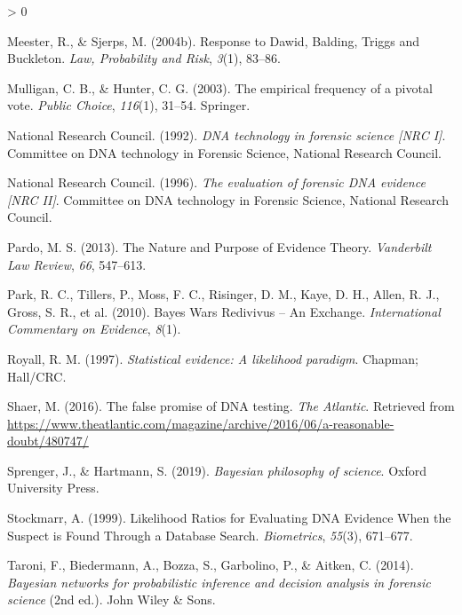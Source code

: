\documentclass[
  10pt,
  dvipsnames,enabledeprecatedfontcommands]{scrartcl}
\newlength{\cslhangindent}
\newenvironment{CSLReferences}[2] %
 {%
  \setlength{\parindent}{0pt}
  \ifodd #1 \everypar{\setlength{\hangindent}{\cslhangindent}}\ignorespaces\fi
  \ifnum #2 > 0
  \setlength{\parskip}{#2\baselineskip}
  \fi
 }%
 {}
\begin{document}
\begin{CSLReferences}{1}{0}
\leavevmode\hypertarget{ref-meester2004ResponseDawidBalding}{}%
Meester, R., \& Sjerps, M. (2004b). Response to {Dawid}, {Balding},
{Triggs} and {Buckleton}. \emph{Law, Probability and Risk}, \emph{3}(1),
83--86.

\leavevmode\hypertarget{ref-mulligan2003empirical}{}%
Mulligan, C. B., \& Hunter, C. G. (2003). The empirical frequency of a
pivotal vote. \emph{Public Choice}, \emph{116}(1), 31--54. Springer.

\leavevmode\hypertarget{ref-NRCI1992}{}%
National Research Council. (1992). \emph{{DNA} technology in forensic
science {\emph{{[}NRC I{]}}}}. Committee on {DNA} technology in
{F}orensic {S}cience, {N}ational {R}esearch {C}ouncil.

\leavevmode\hypertarget{ref-NRCII1996}{}%
National Research Council. (1996). \emph{The evaluation of forensic
{DNA} evidence {\emph{{[}NRC II{]}}}}. Committee on {DNA} technology in
{F}orensic {S}cience, {N}ational {R}esearch {C}ouncil.

\leavevmode\hypertarget{ref-pardo2013NaturePurposeEvidence}{}%
Pardo, M. S. (2013). The {Nature} and {Purpose} of {Evidence Theory}.
\emph{Vanderbilt Law Review}, \emph{66}, 547--613.

\leavevmode\hypertarget{ref-park2010BayesWarsRedivivus}{}%
Park, R. C., Tillers, P., Moss, F. C., Risinger, D. M., Kaye, D. H.,
Allen, R. J., Gross, S. R., et al. (2010). Bayes {Wars Redivivus} -- {An
Exchange}. \emph{International Commentary on Evidence}, \emph{8}(1).

\leavevmode\hypertarget{ref-Royall1997}{}%
Royall, R. M. (1997). \emph{Statistical evidence: A likelihood
paradigm}. Chapman; Hall/CRC.

\leavevmode\hypertarget{ref-Shaer2016False}{}%
Shaer, M. (2016). The false promise of DNA testing. \emph{The Atlantic}.
Retrieved from
\url{https://www.theatlantic.com/magazine/archive/2016/06/a-reasonable-doubt/480747/}

\leavevmode\hypertarget{ref-sprenger2019bayesian}{}%
Sprenger, J., \& Hartmann, S. (2019). \emph{Bayesian philosophy of
science}. Oxford University Press.

\leavevmode\hypertarget{ref-stockmarr1999LikelihoodRatiosEvaluating}{}%
Stockmarr, A. (1999). Likelihood {Ratios} for {Evaluating DNA Evidence
When} the {Suspect} is {Found Through} a {Database Search}.
\emph{Biometrics}, \emph{55}(3), 671--677.

\leavevmode\hypertarget{ref-taroni2006bayesian}{}%
Taroni, F., Biedermann, A., Bozza, S., Garbolino, P., \& Aitken, C.
(2014). \emph{Bayesian networks for probabilistic inference and decision
analysis in forensic science} (2nd ed.). John Wiley \& Sons.


\end{CSLReferences}
\end{document}
